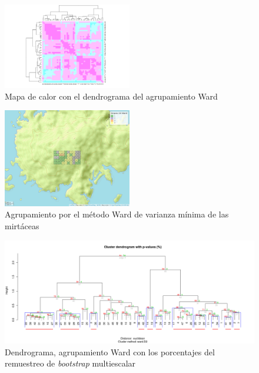 \documentclass[11pt,]{article}
\begin{document}
\begin{figure}
\centering
\includegraphics[width=0.50000\textwidth]{Mapadecalor_Ward_aa2.png}
\caption{Mapa de calor con el dendrograma del agrupamiento Ward
\label{fig:mapadecalor_ward}}
\end{figure}

\begin{figure}
\centering
\includegraphics[width=0.50000\textwidth]{mapa_ward_k4.png}
\caption{Agrupamiento por el método Ward de varianza mínima de las
mirtáceas \label{fig:mapa_ward}}
\end{figure}

\begin{figure}
\centering
\includegraphics{bootstrap_Ward.png}
\caption{Dendrograma, agrupamiento Ward con los porcentajes del
remuestreo de \emph{bootstrap} multiescalar
\label{fig:*bootstrap*_multiescalar}}
\end{figure}
\end{document}
